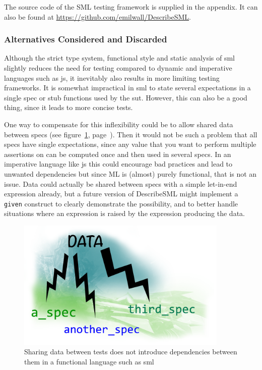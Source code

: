 \documentclass[11pt]{article}
\begin{document}
The source code of the SML testing framework is supplied in the appendix. It can also be found at \url{https://github.com/emilwall/DescribeSML}.

\subsubsection{Alternatives Considered and Discarded}

Although the strict type system, functional style and static analysis of \gls{sml} slightly reduces the need for testing compared to dynamic and imperative languages such as \gls{js}, it inevitably also results in more limiting testing frameworks. It is somewhat impractical in \gls{sml} to state several expectations in a single \gls{spec} or stub functions used by the \gls{sut}. However, this can also be a good thing, since it leads to more concise tests.

One way to compensate for this inflexibility could be to allow shared data between \glspl{spec} (see figure~\ref{fig:data}, page~\pageref{fig:data}). Then it would not be such a problem that all \glspl{spec} have single expectations, since any value that you want to perform multiple assertions on can be computed once and then used in several \glspl{spec}. In an imperative language like \gls{js} this could encourage bad practices and lead to unwanted dependencies but since ML is (almost) purely functional, that is not an issue. Data could actually be shared between \glspl{spec} with a simple let-in-end expression already, but a future version of DescribeSML might implement a \texttt{given} construct to clearly demonstrate the possibility, and to better handle situations where an expression is raised by the expression producing the data.

\begin{figure}[ht!]
\centering
\includegraphics[width=0.9\textwidth]{pics/data.png}
\caption{Sharing data between tests does not introduce dependencies between them in a functional language such as \gls{sml}}
\label{fig:data}
\end{figure}
\end{document}

